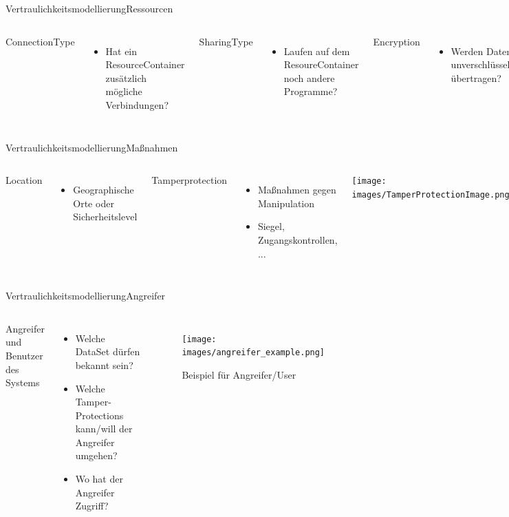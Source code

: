 \documentclass{sdqbeamer}
\begin{document}
\begin{frame}{Vertraulichkeitsmodellierung}{Ressourcen}
	\begin{columns}
ConnectionType
	\begin{itemize}
		\item Hat ein ResourceContainer zusätzlich mögliche Verbindungen?
	\end{itemize}
\vspace{0.05\textheight}
SharingType
\begin{itemize}
	\item Laufen auf dem ResoureContainer noch andere Programme?
\end{itemize}
\vspace{0.05\textheight}
Encryption
\begin{itemize}
	\item Werden Daten unverschlüsselt übertragen?
\end{itemize}
\end{columns}
\end{frame}	

\begin{frame}{Vertraulichkeitsmodellierung}{Maßnahmen}
	\begin{columns}
		Location
		\begin{itemize}
			\item Geographische Orte oder Sicherheitslevel
		\end{itemize}
		\vspace{0.05\textheight}
		Tamperprotection
		\begin{itemize}
			\item Maßnahmen gegen Manipulation
			\item Siegel, Zugangskontrollen, ...
		\end{itemize}
		\texttt{[image: images/TamperProtectionImage.png]}
	\end{columns}
\end{frame}	

\begin{frame}{Vertraulichkeitsmodellierung}{Angreifer}
	\begin{columns}
	\column{0.45\textwidth}
	Angreifer und Benutzer des Systems
	\begin{itemize}
		\item Welche DataSet dürfen bekannt sein?
		\item Welche Tamper-Protections kann/will der Angreifer umgehen?
		\item Wo hat der Angreifer Zugriff?
	\end{itemize}
	\centering
	\begin{figure}
			\texttt{[image: images/angreifer\_example.png]}
			\caption{Beispiel für Angreifer/User}
	\end{figure}
	\end{columns}
\end{frame}	
\end{document}
